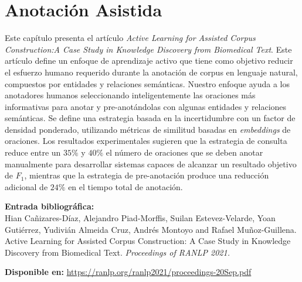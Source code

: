 
\chapter[Anotación Asistida: \textit{Active Learning for Assisted Corpus Construction:A Case Study in Knowledge Discovery from Biomedical Text}]{Anotación Asistida}
\label{Chap:Annotation}

Este capítulo presenta el artículo \textit{Active Learning for Assisted Corpus Construction:A Case Study in Knowledge Discovery from Biomedical Text}.
Este artículo define un enfoque de aprendizaje activo que tiene como objetivo reducir el esfuerzo humano requerido durante la anotación de corpus en lenguaje natural, compuestos por entidades y relaciones semánticas. Nuestro enfoque ayuda a los anotadores humanos seleccionando inteligentemente las oraciones más informativas para anotar y pre-anotándolas con algunas entidades y relaciones semánticas. Se define una estrategia basada en la incertidumbre con un factor de densidad ponderado, utilizando métricas de similitud basadas en \textit{embeddings} de oraciones. Los resultados experimentales sugieren que la estrategia de consulta reduce entre un $35\%$ y $40\%$ el número de oraciones que se deben anotar manualmente para desarrollar sistemas capaces de alcanzar un resultado objetivo de $F_1$,
mientras que la estrategia de pre-anotación produce una reducción adicional de $24\%$ en el tiempo total de anotación.

\BlankLine
\noindent \textbf{Entrada bibliográfica:}\\
Hian Cañizares-Díaz, Alejandro Piad-Morffis, Suilan Estevez-Velarde, Yoan Gutiérrez, Yudivián
Almeida Cruz, Andrés Montoyo and Rafael Muñoz-Guillena. Active Learning for Assisted Corpus Construction: A Case Study in Knowledge Discovery from Biomedical Text. \textit{Proceedings of RANLP 2021.}

\BlankLine
\noindent \textbf{Disponible en:} \url{https://ranlp.org/ranlp2021/proceedings-20Sep.pdf}
